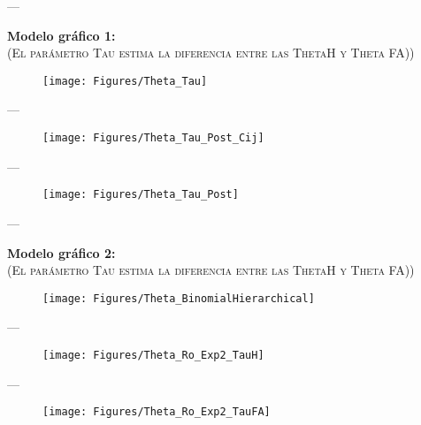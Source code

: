 \documentclass[a4paper ]{article}
\begin{document}
---
\begin{center}
{\LARGE \textbf{Modelo gráfico 1:} }\\
{\small \textsc{(El parámetro Tau estima la diferencia entre las ThetaH y Theta FA))}}\\
\smallskip
\end{center}

\begin{figure}[h]
\centering
\texttt{[image: Figures/Theta\_Tau]}
\end{figure}
\clearpage


---
\begin{figure}[h]
\centering
\texttt{[image: Figures/Theta\_Tau\_Post\_Cij]}
\end{figure}
\clearpage

---
\begin{figure}[h]
\centering
\texttt{[image: Figures/Theta\_Tau\_Post]}
\end{figure}
\clearpage




---
\begin{center}
{\LARGE \textbf{Modelo gráfico 2:} }\\
{\small \textsc{(El parámetro Tau estima la diferencia entre las ThetaH y Theta FA))}}\\
\smallskip
\end{center}

\begin{figure}[h]
\centering
\texttt{[image: Figures/Theta\_BinomialHierarchical]}
\end{figure}
\clearpage




---
\begin{figure}[h]
\centering
\texttt{[image: Figures/Theta\_Ro\_Exp2\_TauH]}
\end{figure}
\clearpage


---
\begin{figure}[h]
\centering
\texttt{[image: Figures/Theta\_Ro\_Exp2\_TauFA]}
\end{figure}
\clearpage
\end{document}
